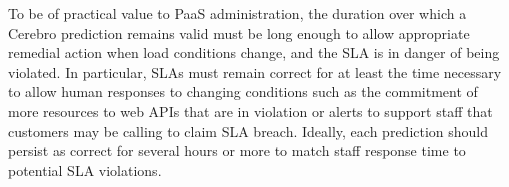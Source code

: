 


To be of practical value to PaaS administration, the duration over which a
Cerebro prediction remains valid must be long enough to allow appropriate
remedial action when load conditions change, and the SLA is in danger of being
violated.  In particular, SLAs must remain correct for at least the time
necessary to allow human responses to changing conditions such as
the commitment of more resources to web APIs that are in violation or alerts
to support staff that customers may be calling to claim SLA breach.  Ideally,
each prediction should persist as correct for several hours or more to match
staff response time to potential SLA violations.


